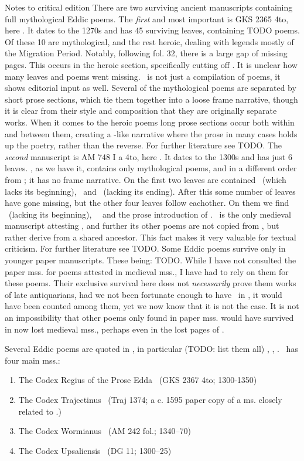 Notes to critical edition
  There are two surviving ancient manuscripts containing full mythological Eddic poems.
  The \emph{first} and most important is GKS 2365 4to, here \Regius. It dates to the 1270s and has 45 surviving leaves, containing TODO poems. Of these 10 are mythological, and the rest heroic, dealing with legends mostly of the Migration Period. Notably, following fol. 32, there is a large gap of missing pages. This occurs in the heroic section, specifically cutting off \Sigrdrifumal. It is unclear how many leaves and poems went missing.
  \Regius\ is not just a compilation of poems, it shows editorial input as well. Several of the mythological poems are separated by short prose sections, which tie them together into a loose frame narrative, though it is clear from their style and composition that they are originally separate works. When it comes to the heroic poems long prose sections occur both within and between them, creating a -like narrative where the prose in many cases holds up the poetry, rather than the reverse. For further literature see TODO.
  The \emph{second} manuscript is AM 748 I a 4to, here \AM. It dates to the 1300s and has just 6 leaves. \AM, as we have it, contains only mythological poems, and in a different order from \Regius; it has no frame narrative. On the first two leaves are contained \Harbardsljod\ (which lacks its beginning), \Baldrsdraumar\ and \Skirnismal\ (lacking its ending). After this some number of leaves have gone missing, but the other four leaves follow eachother. On them we find \Vafthrudnismal\ (lacking its beginning), \Grimnismal\, \Hymiskvida\ and the prose introduction of \Volundarkvida. \AM\ is the only medieval manuscript attesting \Baldrsdraumar, and further its other poems are not copied from \Regius, but rather derive from a shared ancestor. This fact makes it very valuable for textual criticism. For further literature see TODO.
  Some Eddic poems survive only in younger paper manuscripts. These being: TODO. While I have not consulted the paper mss. for poems attested in medieval mss., I have had to rely on them for these poems. Their exclusive survival here does not \emph{necessarily} prove them works of late antiquarians, had we not been fortunate enough to have \Baldrsdraumar\ in \AM, it would have been counted among them, yet we now know that it is not the case. It is not an impossibility that other poems only found in paper mss. would have survived in now lost medieval mss., perhaps even in the lost pages of \AM.
  
  Several Eddic poems are quoted in \Gylfaginning, in particular (TODO: list them all) \Voluspa, \Vafthrudnismal, \Grimnismal. \Gylfaginning\ has four main mss.:\begin{enumerate}
	\item The Codex Regius of the Prose Edda \RegiusProse\ (GKS 2367 4to; 1300-1350)
	\item The Codex Trajectinus \Trajectinus\ (Traj 1374; a c. 1595 paper copy of a ms. closely related to \RegiusProse.)
	\item The Codex Wormianus \Wormianus\ (AM 242 fol.; 1340–70)
	\item The Codex Upsaliensis \Upsaliensis\ (DG 11; 1300–25)
\end{enumerate}

